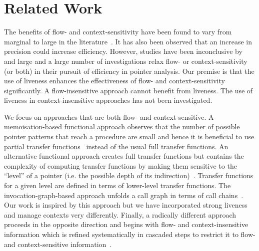\documentclass{llncs}
\begin{document}
\section{Related Work}
\label{sec:related.work}

The benefits of flow- and context-sensitivity have been found to 
vary from marginal to large in the literature~\cite{Ruf.E:1995:Context-Insensitive-Alias-Analysis,Lhotak.O.Hendren.LJ:2006:Context-sensitive-points-to-analysis,Shapiro.M.Horwitz.S:1997:Effects-of-Precision,Hind.M.Pioli.A:1998:Assessing-Effects-of}. 
It has also been observed that  an increase in precision could 
increase efficiency. However, studies have been inconclusive by and large
and a large number of investigations relax
flow- or context-sensitivity (or both) in their pursuit of efficiency in
pointer analysis.  Our premise is that the use of liveness enhances
the effectiveness of flow- and context-sensitivity significantly.
A flow-insensitive approach cannot benefit from liveness.
The use of liveness in context-insensitive approaches
has not been investigated. 



We focus on approaches that are both flow- and context-sensitive. 
A memoisation-based functional approach observes that
the number of possible pointer patterns
that reach a procedure are small and hence it is beneficial to use
partial transfer
functions~\cite{Wilson.RP.Lam.MS:1995:Efficient-Context-Sensitive-Pointer} 
instead of the usual full transfer functions.
An alternative functional approach creates full transfer
functions but contains the complexity of computing transfer functions
by making them sensitive to the ``level'' of a pointer (i.e. the
possible depth of its
indirection)~\cite{Yu.H.Xue.J.Huo.W.Feng.X.ea:2010:Level-by-level}.
Transfer functions for a given level are defined in terms of
lower-level transfer functions. 
The invocation-graph-based approach unfolds a call graph in terms
of call chains~\cite{Emami.M.Ghiya.R.Hendren.LJ:1994:Context-sensitive-interprocedural-points-to}.
Our work is inspired by this approach but we have incorporated strong liveness
and manage contexts very differently.
Finally, a radically different approach
proceeds in the opposite direction and begins with flow- and
context-insensitive information which is refined systematically
in cascaded steps to restrict it to flow- and context-sensitive
information~\cite{Kahlon.V:2008:Bootstrapping-technique-for}.
\end{document}
